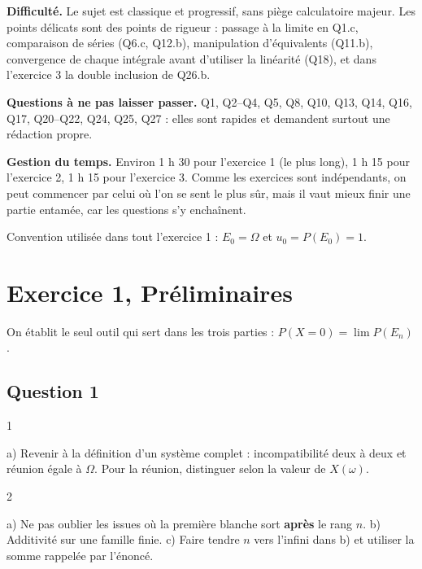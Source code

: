 \documentclass[11pt,a4paper]{article}
\begin{document}
\textbf{Difficulté.} Le sujet est classique et progressif, sans piège calculatoire majeur. Les points délicats sont des points de rigueur : passage à la limite en Q1.c, comparaison de séries (Q6.c, Q12.b), manipulation d'équivalents (Q11.b), convergence de chaque intégrale avant d'utiliser la linéarité (Q18), et dans l'exercice 3 la double inclusion de Q26.b.

\textbf{Questions à ne pas laisser passer.} Q1, Q2--Q4, Q5, Q8, Q10, Q13, Q14, Q16, Q17, Q20--Q22, Q24, Q25, Q27 : elles sont rapides et demandent surtout une rédaction propre.

\textbf{Gestion du temps.} Environ 1 h 30 pour l'exercice 1 (le plus long), 1 h 15 pour l'exercice 2, 1 h 15 pour l'exercice 3. Comme les exercices sont indépendants, on peut commencer par celui où l'on se sent le plus sûr, mais il vaut mieux finir une partie entamée, car les questions s'y enchaînent.

Convention utilisée dans tout l'exercice 1 : \(E_0=\Omega\) et \(u_0=P(E_0)=1\).

\hypertarget{exercice-1-pruxe9liminaires}{%
\section{Exercice 1, Préliminaires}\label{exercice-1-pruxe9liminaires}}

On établit le seul outil qui sert dans les trois parties : \(P(X=0)=\lim P(E_n)\).

\hypertarget{question-1}{%
\subsection{Question 1}\label{question-1}}

\begin{indication}{1}

a) Revenir à la définition d'un système complet : incompatibilité deux à deux et réunion égale à \(\Omega\). Pour la réunion, distinguer selon la valeur de \(X(\omega)\).

\end{indication}

\begin{indication}{2}

a) Ne pas oublier les issues où la première blanche sort \textbf{après} le rang \(n\). b) Additivité sur une famille finie. c) Faire tendre \(n\) vers l'infini dans b) et utiliser la somme rappelée par l'énoncé.

\end{indication}
\end{document}
